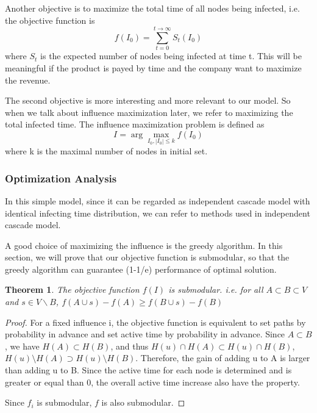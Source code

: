 \documentclass{article}
\newtheorem{theorem}{Theorem}
\begin{document}
Another objective is to maximize the total time of all nodes being infected, i.e. the objective function is
\begin{equation}
f(I_0) = \sum_{t=0}^{t\to\infty}S_t(I_0)
\end{equation} 
where $S_t$ is the expected number of nodes being infected at time t. This will be meaningful if the product is payed by time and the company want to maximize the revenue.

The second objective is more interesting and more relevant to our model. So when we talk about influence maximization later, we refer to maximizing the total infected time. The influence maximization problem is defined as
\begin{equation}
I=\arg\max_{I_0,|I_0|\leq k}f(I_0)
\end{equation}
where k is the maximal number of nodes in initial set.

\subsubsection{Optimization Analysis}
In this simple model, since it can be regarded as independent cascade model with identical infecting time distribution, we can refer to methods used in independent cascade model.

A good choice of maximizing the influence is the greedy algorithm. In this section, we will prove that our objective function is submodular, so that the greedy algorithm can guarantee (1-1/e) performance of optimal solution.

\begin{theorem}
The objective function $f(I)$ is submodular. i.e. for all $A\subset B\subset V$ and $s\in V\backslash B$, $f(A\cup{s})-f(A)\geq f(B\cup{s})-f(B)$
\end{theorem}
\begin{proof}
For a fixed influence i, the objective function is equivalent to set paths by probability in advance and set active time by probability in advance. Since $A\subset B$, we have $H(A)\subset H(B)$, and thus $H(u)\cap H(A)\subset H(u)\cap H(B)$, $H(u)\setminus H(A)\supset H(u)\setminus H(B)$. Therefore, the gain of adding u to A is larger than adding u to B. Since the active time for each node is determined and is greater or equal than 0, the overall active time increase also have the property.

Since $f_i$ is submodular, $f$ is also submodular.
\end{proof}
\end{document}
